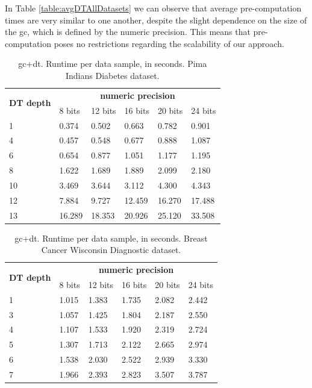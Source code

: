 In Table \ref{table:avgDTAllDatasets} we can observe that average pre-computation times are very similar to one another, despite the slight dependence on the size of the \ac{gc}, which is defined by the numeric precision. This means that pre-computation poses no restrictions regarding the scalability of our approach.


\begin{table}[htp]
\centering
\caption{\acs{gc}+\acs{dt}. Runtime per data sample, in seconds. Pima Indians Diabetes dataset.}
\label{table:runtimeDTPID}
\begin{tabular}{|l|l|l|l|l|l|}
\hline
\multirow{2}{*}{\textbf{DT depth}} & \multicolumn{5}{c|}{\textbf{numeric precision}}         \\ \cline{2-6} 
                          & 8 bits & 12 bits & 16 bits & 20 bits & 24 bits \\ \hline
1                         & 0.374  & 0.502   & 0.663   & 0.782   & 0.901   \\ \hline
4                         & 0.457  & 0.548   & 0.677   & 0.888   & 1.087   \\ \hline
6                         & 0.654  & 0.877   & 1.051   & 1.177   & 1.195   \\ \hline
8                         & 1.622  & 1.689   & 1.889   & 2.099   & 2.180   \\ \hline
10                        & 3.469  & 3.644   & 3.112   & 4.300   & 4.343   \\ \hline
12                        & 7.884  & 9.727   & 12.459  & 16.270  & 17.488  \\ \hline
13                        & 16.289 & 18.353  & 20.926  & 25.120  & 33.508  \\ \hline
\end{tabular}
\end{table}

\begin{table}[htp]
\centering
\caption{\acs{gc}+\acs{dt}. Runtime per data sample, in seconds. Breast Cancer Wisconsin Diagnostic dataset.}
\label{table:runtimeDTBCW}
\begin{tabular}{|l|l|l|l|l|l|}
\hline
\multirow{2}{*}{\textbf{DT depth}} & \multicolumn{5}{c|}{\textbf{numeric precision}}         \\ \cline{2-6} 
                          & 8 bits & 12 bits & 16 bits & 20 bits & 24 bits \\ \hline
1                         & 1.015  & 1.383   & 1.735   & 2.082   & 2.442   \\ \hline
3                         & 1.057  & 1.425   & 1.804   & 2.187   & 2.550   \\ \hline
4                         & 1.107  & 1.533   & 1.920   & 2.319   & 2.724   \\ \hline
5                         & 1.307  & 1.713   & 2.122   & 2.665   & 2.974   \\ \hline
6                         & 1.538  & 2.030   & 2.522   & 2.939   & 3.330   \\ \hline
7                         & 1.966  & 2.393   & 2.823   & 3.507   & 3.787   \\ \hline
\end{tabular}
\end{table}


